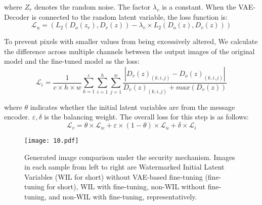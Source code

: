 \noindent where $Z_r$ denotes the random noise. The factor $\lambda_v$ is a constant. When the VAE-Decoder is connected to the random latent variable, the loss function is:
\begin{equation}
\mathcal{L}_u=(L_2(D_o(z_{r}),D_v(z))-\lambda_v \times  L_2(D_o(z),D_v(z)))
\end{equation}

To prevent pixels with smaller values from being excessively altered, We calculate the difference across multiple channels between the output images of the original model and the fine-tuned model as the loss:
\begin{equation}
    \mathcal{L}_i=\frac{1}{c\times h\times w}\sum_{k=1}^c\sum_{i=1}^h\sum_{j=1}^w\frac{\left|D_v(z)_{(k,i,j)}-{D_o(z)}_{(k,i,j)}\right|}{D_v(z)_{(k,i,j)}+max(D_v(z))}
\end{equation}



\noindent where $\theta$ indicates whether the initial latent variables are from the message encoder. $\varepsilon,\delta$ is the balancing weight. The overall loss for this step is as follows:
\begin{equation}
\mathcal{L}_v=\theta\times\mathcal{L}_w+\varepsilon\times(1-\theta) \times \mathcal{L}_u+\delta\times \mathcal{L}_i
\end{equation}

\begin{figure*}[t]
\centering
\texttt{[image: 10.pdf]} %
\caption{Generated image comparison under the security mechanism. Images in each sample from left to right are Watermarked Initial Latent Variables (WIL for short) without VAE-based fine-tuning (fine-tuning for short), WIL with fine-tuning, non-WIL without fine-tuning, and non-WIL with fine-tuning, representatively.}
\label{fig8}
\end{figure*}

